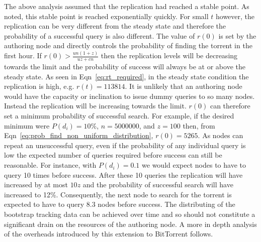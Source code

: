     The above analysis assumed that the replication had reached a stable point. As noted, this stable point is reached exponentially quickly. For small $t$ however, the replication can be very different from the steady state and therefore the probability of a successful query is also different. The value of $r(0)$ is set by the authoring node and directly controls the probability of finding the torrent in the first hour. If $r(0) > \frac{un(1+z)}{uz+cn}$ then the replication levels will be decreasing towards the limit and the probability of success will always be at or above the steady state. As seen in Eqn~\ref{eq:rt_required}, in the steady state condition the replication is high, e.g. $r(t)=113814$. It is unlikely that an authoring node would have the capacity or inclination to issue dummy queries to so many nodes. Instead the replication will be increasing towards the limit. $r(0)$ can therefore set a minimum probability of successful search. For example, if the desired minimum were $P(d_i)=10\%$, $n=5000000$, and $z=100$ then, from Eqn~\ref{eq:prob_find_non_uniform_distribution}, $r(0)=5265$. As nodes can repeat an unsuccessful query, even if the probability of any individual query is low the expected number of queries required before success can still be reasonable. For instance, with $P(d_i)=0.1$ we would expect nodes to have to query 10 times before success. After these 10 queries the replication will have increased by at most $10z$ and the probability of successful search will have increased to 12\%. Consequently, the next node to search for the torrent is expected to have to query 8.3 nodes before success. The distributing of the bootstrap tracking data can be achieved over time and so should not constitute a significant drain on the resources of the authoring node. A more in depth analysis of the overheads introduced by this extension to BitTorrent follows.
